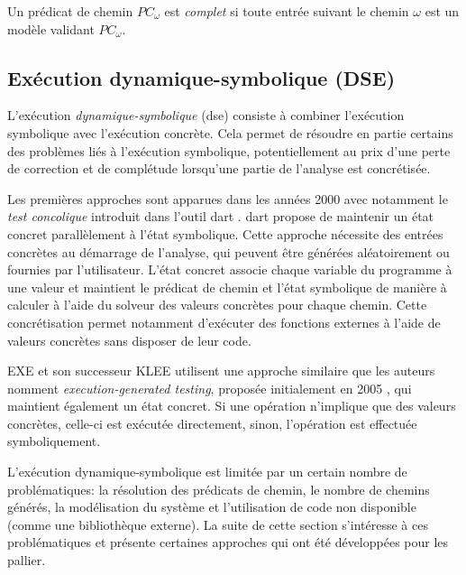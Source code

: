             \begin{defi}
            \label{def:pc-complete}
                Un prédicat de chemin $PC_{\omega}$ est \textit{complet} si toute entrée suivant le chemin $\omega$ est un modèle validant $PC_{\omega}$.
            \end{defi}
        
        \subsection{Exécution dynamique-symbolique (DSE)}
        \label{sec:dse}                
            
            L'exécution \textit{dynamique-symbolique} (\gls{dse}) consiste à combiner l'exécution symbolique avec l'exécution concrète. Cela permet de résoudre en partie certains des problèmes liés à l'exécution symbolique, potentiellement au prix d'une perte de correction et de complétude lorsqu'une partie de l'analyse est concrétisée.
                   
            \begin{sloppypar}  
            Les premières approches sont apparues dans les années 2000 avec notamment le \textit{test concolique} introduit dans l'outil \gls{dart} \cite{Godefroid/PLDI05}. \gls{dart} propose de maintenir un état concret parallèlement à l'état symbolique. Cette approche nécessite des entrées concrètes au démarrage de l'analyse, qui peuvent être générées aléatoirement ou fournies par l'utilisateur. L'état concret associe chaque variable du programme à une valeur et maintient le prédicat de chemin et l'état symbolique de manière à calculer à l'aide du solveur des valeurs concrètes pour chaque chemin. Cette concrétisation permet notamment d'exécuter des fonctions externes à l'aide de valeurs concrètes sans disposer de leur code.        
            \end{sloppypar}  
            
            EXE \cite{Cadar/ACM08} et son successeur KLEE \cite{Cadar/OSDI08} utilisent une approche similaire que les auteurs nomment \textit{execution-generated testing}, proposée initialement en 2005 \cite{Cadar/SPIN05}, qui maintient également un état concret. Si une opération n'implique que des valeurs concrètes, celle-ci est exécutée directement, sinon, l'opération est effectuée symboliquement. 
            
            L'exécution dynamique-symbolique est limitée par un certain nombre de problématiques: la résolution des prédicats de chemin, le nombre de chemins générés, la modélisation du système et l'utilisation de code non disponible (comme une bibliothèque externe). La suite de cette section s'intéresse à ces problématiques et présente certaines approches qui ont été développées pour les pallier.
            
